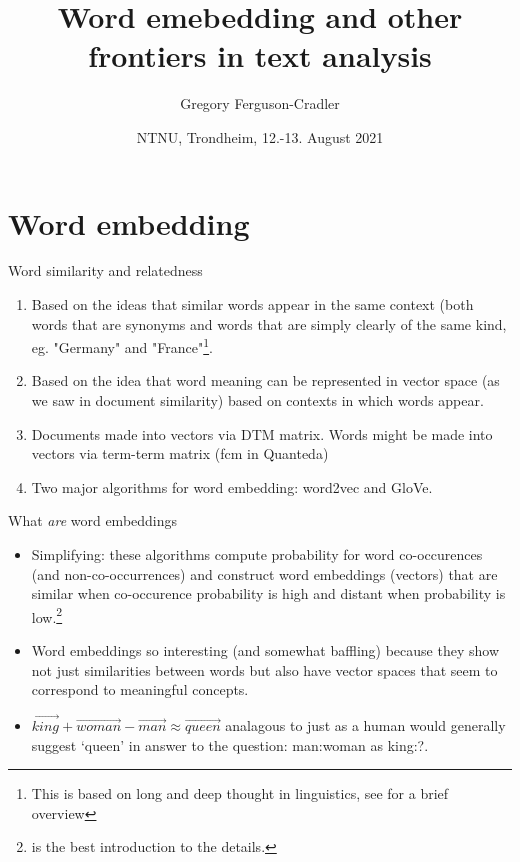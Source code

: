 \documentclass[t]{beamer}
\title{\huge Word emebedding and other frontiers in text analysis}
\author{Gregory Ferguson-Cradler}
\institute{Institutt for rettsvitenskap, filosofi og internasjonale studier \\ Høgskolen i Innlandet, Lillehammer}
\date{NTNU, Trondheim, 12.-13. August 2021} %
\begin{document}
\begin{frame}[plain]
    \titlepage    
\end{frame}


\section{Word embedding}
\begin{frame}{Word similarity and relatedness}
\begin{enumerate}
    \item Based on the ideas that similar words appear in the same context (both words that are synonyms and words that are simply clearly of the same kind, eg. "Germany" and "France"\footnote{This is based on long and deep thought in linguistics, see \autocite{jurafsky2014speech} for a brief overview}.
    \item Based on the idea that word meaning can be represented in vector space (as we saw in document similarity) based on contexts in which words appear.
    \item Documents made into vectors via DTM matrix. Words might be made into vectors via term-term matrix (fcm in Quanteda)
    \item Two major algorithms for word embedding: word2vec and GloVe. 
\end{enumerate}
\end{frame}

\begin{frame}{What \textit{are} word embeddings}
\begin{itemize}
    \item Simplifying: these algorithms compute probability for word co-occurences (and non-co-occurrences) and construct word embeddings (vectors) that are similar when co-occurence probability is high and distant when probability is low.\footnote{\textcite{jurafsky2014speech} is the best introduction to the details.}
    \item Word embeddings so interesting (and somewhat baffling) because they show not just similarities between words but also have vector spaces that seem to correspond to meaningful concepts. 
    \item $\overrightarrow{king} + \overrightarrow{woman} - \overrightarrow{man} \approx \overrightarrow{queen}$ analagous to just as a human would generally suggest `queen' in answer to the question: man:woman as king:\underline{\hspace{1cm}}?. 
\end{itemize}
\end{frame}
\end{document}
